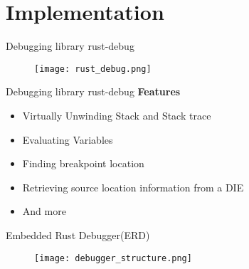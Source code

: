 \section{Implementation}

\begin{frame}{Debugging library rust-debug}
	\begin{figure}
		\texttt{[image: rust\_debug.png]}
	\end{figure}
\end{frame}


\begin{frame}{Debugging library rust-debug}
	\textbf{Features}
    \begin{itemize}
        \item Virtually Unwinding Stack and Stack trace
        \item Evaluating Variables
        \item Finding breakpoint location
        \item Retrieving source location information from a DIE
        \item And more
    \end{itemize}
\end{frame}


\begin{frame}{Embedded Rust Debugger(ERD)}
	\begin{figure}
		\texttt{[image: debugger\_structure.png]}
	\end{figure}
\end{frame}





